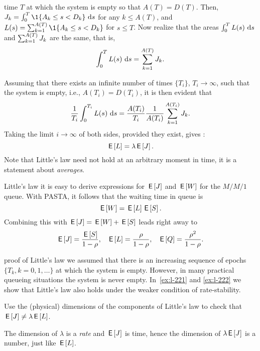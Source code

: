  time $T$ at which the system is empty so that $A(T) = D(T)$.
Then, $ \J_k = \int_0^T \1{A_k \leq s < D_k}\,\d s$ for any $k\leq A(T)$,
and $\L(s) = \sum_{k=1}^{A(T)}\1{A_k \leq s < D_k}$ for $s\leq T$.
Now realize that the areas $\int_0^T L(s)\, \,\textrm{d}s$ and $\sum_{k=1}^{A(T)} J_k$ are the same, that is,
\begin{equation}\label{eq:111}
 \int_0^T L(s)\, \,\textrm{d}s = \sum_{k=1}^{A(T)} J_k.
\end{equation}

Assuming that there exists an infinite number of times $\{T_i\}$,  $T_i\to\infty$, such that the system is empty, i.e.,  $A(T_i) = D(T_i)$, it is then evident that
\begin{equation*}
 \frac 1 {T_i} \int_0^{T_i} L(s)\, \,\textrm{d}s = \frac{A(T_i)} {T_i} \frac{1}{A(T_i)} \sum_{k=1}^{A(T_i)} J_k.
\end{equation*}
Taking the limit $i\to\infty$ of both sides, provided they exist, gives :
\begin{equation*}
 \,\mathsf{E}\left[L\right] = \lambda \,\mathsf{E}\left[J\right].
\end{equation*}
Note that Little's law need not hold at an arbitrary moment in time, it is a statement about \emph{averages}.


 Little's law it is easy to derive expressions for $\,\mathsf{E}\left[J\right]$ and $\,\mathsf{E}\left[W\right]$ for the $M/M/1$ queue.
With PASTA, it follows that the waiting time in queue is
\begin{equation}\label{eq:wqes}
 \,\mathsf{E}\left[W\right] = \,\mathsf{E}\left[L\right] \,\mathsf{E}\left[S\right].
\end{equation}
Combining this with $\,\mathsf{E}\left[J\right] = \,\mathsf{E}\left[W\right] + \,\mathsf{E}\left[S\right]$ leads right away to
 \begin{align}\label{eq:110}
 \,\mathsf{E}\left[J\right] &= \frac{\,\mathsf{E}\left[S\right]}{1-\rho}, & \,\mathsf{E}\left[L\right] &= \frac\rho{1-\rho}, & \,\mathsf{E}\left[Q\right] = \frac{\rho^2}{1-\rho}.
 \end{align}


  proof of Little's law we assumed that there is an increasing sequence of epochs $\{T_k, k=0,1,\ldots\}$ at which the system is empty.
 However, in many practical queueing situations the system is never empty.
 In~\cref{ex:l-221} and \cref{ex:l-222} we show that Little's law also  holds under the weaker condition of rate-stability.



\begin{exercise}\label{ex:42}
  Use
  the (physical) dimensions of the components of Little's law to check that $\,\mathsf{E}\left[J\right] \neq \lambda \,\mathsf{E}\left[L\right]$.
\begin{solution}
  The dimension of $\lambda$ is a \emph{rate} and $\,\mathsf{E}\left[J\right]$ is time, hence the dimension of $\lambda \,\mathsf{E}\left[J\right]$ is a number, just like $\,\mathsf{E}\left[L\right]$.
\end{solution}
\end{exercise}


